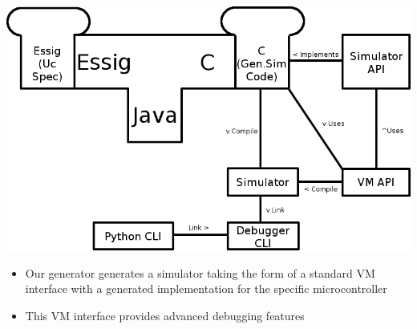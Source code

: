 \begin{block}{\large {}\vphantom{Design}}
\begin{center}
	\includegraphics{figures/design_diagram.png}\\
\end{center}
\begin{itemize}
\item{Our generator generates a simulator taking the form of a standard VM interface
with a generated implementation for the specific microcontroller}
\item{This VM interface provides advanced debugging features}
\end{itemize}
\end{block}

